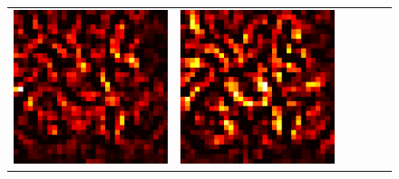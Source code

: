 \documentclass[preprint,12pt]{elsarticle}
\begin{document}
\begin{figure}[p]
\begin{tabular}{cccccc}
  \includegraphics[scale=\scale]{../visualizations/examples/cifar10/resnet18/positive_saliency_map/3.png} & 
  \includegraphics[scale=\scale]{../visualizations/examples/cifar10/resnet18/negative_saliency_map/3.png} & 

\end{tabular}
\end{figure}
\end{document}
